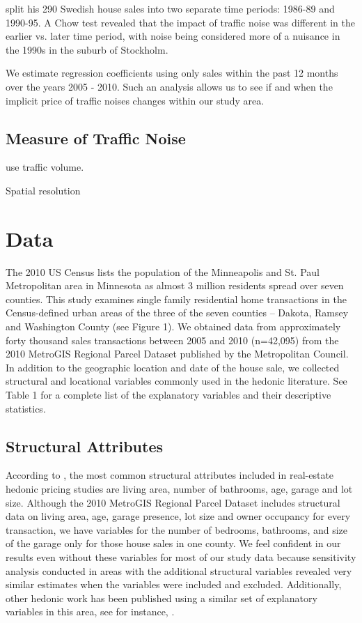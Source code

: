 \documentclass{article}\usepackage{graphicx, color}
\begin{document}
\citet{Wilhelmsson2000} split his 290 Swedish house sales into two separate time periods: 1986-89 and 1990-95. A Chow test revealed that the impact of traffic noise was different in the earlier vs. later time period, with noise being considered more of a nuisance in the 1990s in the suburb of Stockholm. 

We estimate regression coefficients using only sales within the past 12 months over the years 2005 - 2010. Such an analysis allows us to see if and when the implicit price of traffic noises changes within our study area. 

\subsection{Measure of Traffic Noise}

\citet{HughsSirmans} use traffic volume. 

Spatial resolution


\section{Data}
The 2010 US Census lists the population of the Minneapolis and St. Paul Metropolitan area in Minnesota as almost 3 million residents spread over seven counties. This study examines single family residential home transactions in the Census-defined urban areas of the three of the seven counties – Dakota, Ramsey and Washington County (see Figure 1). We obtained data from approximately forty thousand sales transactions between 2005 and 2010 (n=42,095) from the 2010 MetroGIS Regional Parcel Dataset published by the Metropolitan Council. In addition to the geographic location and date of the house sale, we collected structural and locational variables commonly used in the hedonic literature. See Table 1 for a complete list of the explanatory variables and their descriptive statistics. 

\subsection{Structural Attributes}
According to \cite{Wilhelmsson2000}, the most common structural attributes included in real-estate hedonic pricing studies are living area, number of bathrooms, age, garage and lot size.  Although the 2010 MetroGIS Regional Parcel Dataset includes structural data on living area, age, garage presence, lot size and owner occupancy for every transaction, we have variables for the number of bedrooms, bathrooms, and size of the garage only for those house sales in one county. We feel confident in our results even without these variables for most of our study data because sensitivity analysis conducted in areas with the additional structural variables revealed very similar estimates when the variables were included and excluded. Additionally, other hedonic work has been published using a similar set of explanatory variables in this area, see for instance, \citet{Sander2009b}.
\end{document}
